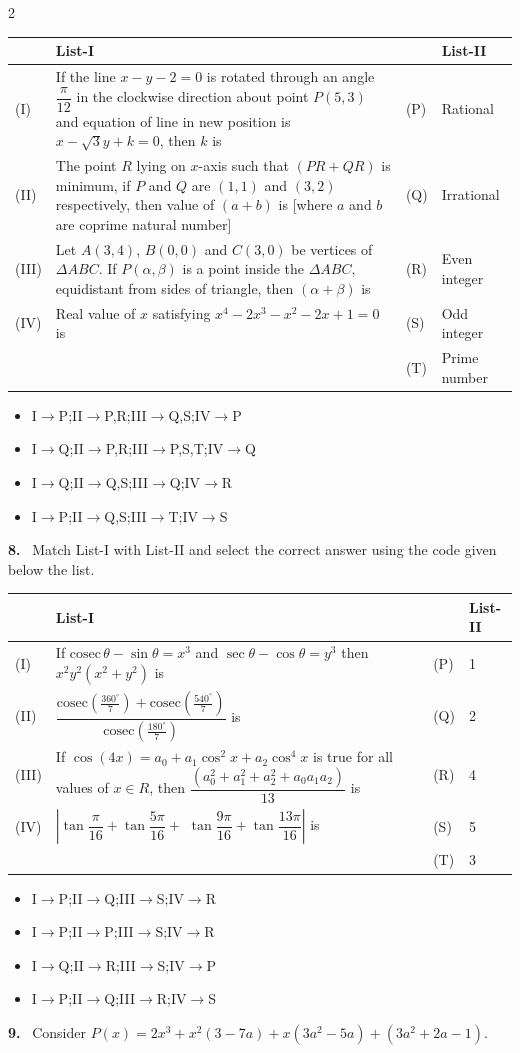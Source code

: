 \documentclass[10pt]{extarticle}
\newcommand{\qn}[1]{\par\smallskip\noindent\textbf{#1.}~}
\newenvironment{qoptions}{\begin{itemize}[leftmargin=1.8em,itemsep=1pt,topsep=2pt,label={}]}{\end{itemize}}
\newcommand{\opt}[2]{\item[(#1)] #2}
\begin{document}
\begin{multicols}{2}
{\footnotesize\setlength{\tabcolsep}{2pt}
\begin{tabular}{|l|p{3.9cm}|l|p{1.8cm}|}
\hline
 & List-I & & List-II\\
\hline
(I) & If the line $x-y-2=0$ is rotated through an angle $\dfrac\pi{12}$ in the clockwise direction about point $P(5,3)$ and equation of line in new position is $x-\sqrt3y+k=0$, then $k$ is & (P) & Rational\\
(II) & The point $R$ lying on $x$-axis such that $(PR+QR)$ is minimum, if $P$ and $Q$ are $(1,1)$ and $(3,2)$ respectively, then value of $(a+b)$ is [where $a$ and $b$ are coprime natural number] & (Q) & Irrational\\
(III) & Let $A(3,4)$, $B(0,0)$ and $C(3,0)$ be vertices of $\Delta ABC$. If $P(\alpha,\beta)$ is a point inside the $\Delta ABC$, equidistant from sides of triangle, then $(\alpha+\beta)$ is & (R) & Even integer\\
(IV) & Real value of $x$ satisfying $x^4-2x^3-x^2-2x+1=0$ is & (S) & Odd integer\\
 & & (T) & Prime number\\
\hline
\end{tabular}}
\begin{qoptions}
\opt{A}{I$\to$P;II$\to$P,R;III$\to$Q,S;IV$\to$P}
\opt{B}{I$\to$Q;II$\to$P,R;III$\to$P,S,T;IV$\to$Q}
\opt{C}{I$\to$Q;II$\to$Q,S;III$\to$Q;IV$\to$R}
\opt{D}{I$\to$P;II$\to$Q,S;III$\to$T;IV$\to$S}
\end{qoptions}
\qn{8} Match List-I with List-II and select the correct answer using the code given below the list.

{\footnotesize\setlength{\tabcolsep}{2pt}
\begin{tabular}{|l|p{4.4cm}|l|l|}
\hline
 & List-I & & List-II\\
\hline
(I) & If $\mathrm{cosec}\,\theta-\sin\theta=x^3$ and $\sec\theta-\cos\theta=y^3$ then $x^2y^2(x^2+y^2)$ is & (P) & 1\\
(II) & $\dfrac{\mathrm{cosec}\left(\frac{360^\circ}7\right)+\mathrm{cosec}\left(\frac{540^\circ}7\right)}{\mathrm{cosec}\left(\frac{180^\circ}7\right)}$ is & (Q) & 2\\
(III) & If $\cos(4x)=a_0+a_1\cos^2x+a_2\cos^4x$ is true for all values of $x\in R$, then $\dfrac{\left(a_0^2+a_1^2+a_2^2+a_0a_1a_2\right)}{13}$ is & (R) & 4\\
(IV) & $\left|\tan\dfrac\pi{16}+\tan\dfrac{5\pi}{16}+\right.$ $\left.\tan\dfrac{9\pi}{16}+\tan\dfrac{13\pi}{16}\right|$ is & (S) & 5\\
 & & (T) & 3\\
\hline
\end{tabular}}
\begin{qoptions}
\opt{A}{I$\to$P;II$\to$Q;III$\to$S;IV$\to$R}
\opt{B}{I$\to$P;II$\to$P;III$\to$S;IV$\to$R}
\opt{C}{I$\to$Q;II$\to$R;III$\to$S;IV$\to$P}
\opt{D}{I$\to$P;II$\to$Q;III$\to$R;IV$\to$S}
\end{qoptions}
\qn{9} Consider $P(x)=2x^3+x^2(3-7a)+x(3a^2-5a)+(3a^2+2a-1)$.


\end{multicols}
\end{document}
